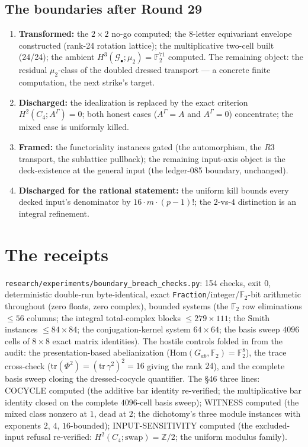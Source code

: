 \documentclass[11pt]{article}
\newcommand{\GammaL}{\Gamma}
\newcommand{\Cfour}{C_4}
\newcommand{\Gbul}{\mathcal{G}_\bullet}
\newcommand{\Z}{\mathbb{Z}}
\newcommand{\F}{\mathbb{F}}
\newcommand{\mud}{\mu_2}
\begin{document}
\subsection*{The boundaries after Round 29}
\begin{enumerate}
\item[(a)] \textbf{Transformed:} the $2\times2$ no-go computed; the
$8$-letter equivariant envelope constructed (rank-24 rotation
lattice); the multiplicative two-cell built (24/24); the ambient
$H^3(\Gbul;\mud)=\F_2^{71}$ computed. The remaining object: the
residual $\mud$-class of the doubled dressed transport --- a concrete
finite computation, the next strike's target.
\item[(b)] \textbf{Discharged:} the idealization is replaced by the
exact criterion $H^2(\Cfour;A^\GammaL)=0$; both honest cases
($A^\GammaL=A$ and $A^\GammaL=0$) concentrate; the mixed case is
uniformly killed.
\item[(c)] \textbf{Framed:} the functoriality instances gated (the
automorphism, the $R3$ transport, the sublattice pullback); the
remaining input-axis object is the deck-existence at the general
input (the ledger-085 boundary, unchanged).
\item[(d)] \textbf{Discharged for the rational statement:} the
uniform kill bounds every decked input's denominator by
$16\cdot m\cdot(p-1)!$; the $2$-vs-$4$ distinction is an integral
refinement.
\end{enumerate}

\section{The receipts}

\texttt{research/experiments/boundary\_breach\_checks.py}: 154 checks,
exit 0, deterministic double-run byte-identical, exact
\texttt{Fraction}/integer/$\F_2$-bit arithmetic throughout (zero
floats, zero complex), bounded systems (the $\F_2$ row eliminations
$\le56$ columns; the integral total-complex blocks
$\le279\times111$; the Smith instances $\le84\times84$; the
conjugation-kernel system $64\times64$; the basis sweep $4096$ cells
of $8\times8$ exact matrix identities). The hostile controls folded
in from the audit: the presentation-based abelianization
(Hom$(G_{ab},\F_2)=\F_2^8$), the trace cross-check
($\mathrm{tr}(\Phi^2)=(\mathrm{tr}\,\gamma^2)^2=16$ giving the rank
$24$), and the complete basis sweep closing the dressed-cocycle
quantifier. The §46 three lines:
COCYCLE computed (the additive bar identity re-verified; the
multiplicative bar identity closed on the complete $4096$-cell basis
sweep); WITNESS computed (the
mixed class nonzero at $1$, dead at $2$; the dichotomy's three module
instances with exponents $2$, $4$, $16$-bounded);
INPUT-SENSITIVITY computed (the excluded-input refusal re-verified:
$H^2(\Cfour;\text{swap})=\Z/2$; the uniform modulus family).
\end{document}
